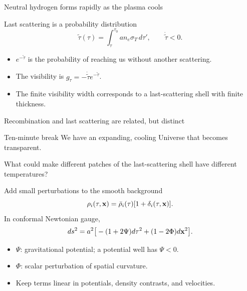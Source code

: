 \begin{frame}{Neutral hydrogen forms rapidly as the plasma cools}
\end{frame}

\begin{frame}{Last scattering is a probability distribution}
\[
\widetilde\tau(\tau)=\int_\tau^{\tau_0} a n_e\sigma_T\,d\tau',
\qquad \dot{\widetilde\tau}<0.
\]
\begin{itemize}
\item $e^{-\widetilde\tau}$ is the probability of reaching us without another scattering.
\item The visibility is $\boxed{g_\tau=-\dot{\widetilde\tau}e^{-\widetilde\tau}}$.
\item The finite visibility width corresponds to a last-scattering shell with finite thickness.
\end{itemize}
\end{frame}

\begin{frame}{Recombination and last scattering are related, but distinct}
\end{frame}

\begin{frame}{Ten-minute break}
\vfill\Large We have an expanding, cooling Universe that becomes transparent.
\medskip\par What could make different patches of the last-scattering shell have different temperatures?
\vfill
\end{frame}

\begin{frame}{Add small perturbations to the smooth background}
\[\rho_i(\tau,\mathbf x)=\bar\rho_i(\tau)[1+\delta_i(\tau,\mathbf x)].\]
In conformal Newtonian gauge,
\[ds^2=a^2\big[-(1+2\Psi)d\tau^2+(1-2\Phi)d\mathbf x^2\big].\]
\begin{itemize}
\item $\Psi$: gravitational potential; a potential well has $\Psi<0$.
\item $\Phi$: scalar perturbation of spatial curvature.
\item Keep terms linear in potentials, density contrasts, and velocities.
\end{itemize}
\end{frame}

